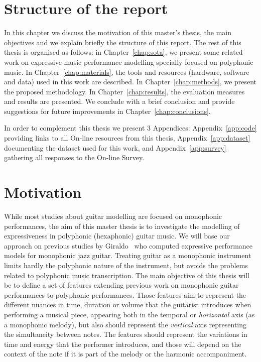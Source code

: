 \section{Structure of the report}
\label{sec:structure}
In this chapter we discuss the motivation of this master's thesis, the main objectives and we explain briefly the structure of this report.
The rest of this thesis is organised as follows: in Chapter~\ref{chap:sota}, we present some related work on expressive music performance modelling specially focused on polyphonic music. In Chapter~\ref{chap:materials}, the tools and resources (hardware, software and data) used in this work are described. In Chapter~\ref{chap:methods}, we present the proposed methodology. In Chapter~\ref{chap:results}, the evaluation measures and results are presented. We conclude with a brief conclusion and provide suggestions for future improvements in Chapter~\ref{chap:conclusions}. 

In order to complement this thesis we present 3 Appendices: Appendix~\ref{app:code} providing links to all On-line resources from this thesis, Appendix~\ref{app:dataset} documenting the dataset used for this work, and Appendix~\ref{app:survey} gathering all responses to the On-line Survey.

\section{Motivation}
\label{sec:motivation}
While most studies about guitar modelling are focused on monophonic performances, the aim of this master thesis is to investigate the modelling of expressiveness in polyphonic (hexaphonic) guitar music. We will base our approach on previous studies by Giraldo~\cite{Giraldo2016} who computed expressive performance models for monophonic jazz guitar. Treating guitar as a monophonic instrument limits hardly the polyphonic nature of the instrument, but avoids the problems related to polyphonic music transcription. The main objective of this thesis will be to define a set of features extending previous work on monophonic guitar performances to polyphonic performances. Those features aim to represent the different nuances in time, duration or volume that the guitarist introduces when performing a musical piece, appearing both in the temporal or \textit{horizontal} axis (as a monophonic melody), but also should represent the \textit{vertical} axis representing the simultaneity between notes. The features should represent the variations in time and energy that the performer introduces, and those will depend on the context of the note if it is part of the melody or the harmonic accompaniment.

